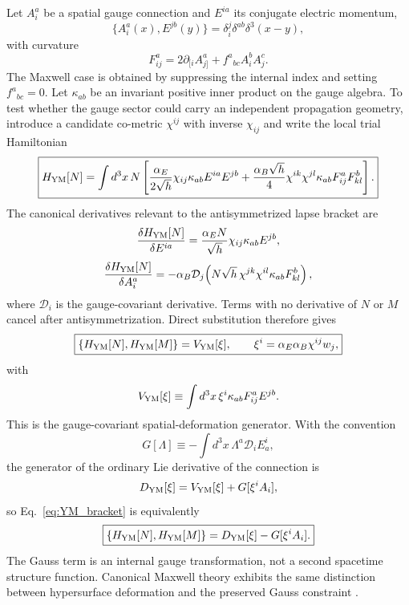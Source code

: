 \documentclass[11pt]{article}
\begin{document}
Let $A_i^a$ be a spatial gauge connection and $E^{ia}$ its conjugate electric momentum,
\begin{equation}
    \{A_i^a(x),E^{jb}(y)\}
    =\delta_i^j\delta^{ab}\delta^3(x-y),
\end{equation}
with curvature
\begin{equation}
    F_{ij}^a=2\partial_{[i}A_{j]}^a+f^a{}_{bc}A_i^bA_j^c.
\end{equation}
The Maxwell case is obtained by suppressing the internal index and setting $f^a{}_{bc}=0$. Let $\kappa_{ab}$ be an invariant positive inner product on the gauge algebra. To test whether the gauge sector could carry an independent propagation geometry, introduce a candidate co-metric $\chi^{ij}$ with inverse $\chi_{ij}$ and write the local trial Hamiltonian
\begin{equation}
\boxed{
H_{\rm YM}[N]
=\int d^3x\,N\left[
\frac{\alpha_E}{2\sqrt h}\chi_{ij}\kappa_{ab}E^{ia}E^{jb}
+\frac{\alpha_B\sqrt h}{4}\chi^{ik}\chi^{jl}
\kappa_{ab}F^a_{ij}F^b_{kl}
\right].}
\label{eq:YM_trial_H}
\end{equation}
The canonical derivatives relevant to the antisymmetrized lapse bracket are
\begin{equation}
    \frac{\delta H_{\rm YM}[N]}{\delta E^{ia}}
    =\frac{\alpha_E N}{\sqrt h}\chi_{ij}\kappa_{ab}E^{jb},
\end{equation}
\begin{equation}
    \frac{\delta H_{\rm YM}[N]}{\delta A_i^a}
    =-\alpha_B\mathcal D_j\!\left(
    N\sqrt h\,\chi^{jk}\chi^{il}\kappa_{ab}F^b_{kl}
    \right),
\end{equation}
where $\mathcal D_i$ is the gauge-covariant derivative. Terms with no derivative of $N$ or $M$ cancel after antisymmetrization. Direct substitution therefore gives
\begin{equation}
\boxed{
\{H_{\rm YM}[N],H_{\rm YM}[M]\}
=V_{\rm YM}[\xi],
\qquad
\xi^i=\alpha_E\alpha_B\chi^{ij}w_j,}
\label{eq:YM_bracket}
\end{equation}
with
\begin{equation}
    V_{\rm YM}[\xi]
    \equiv\int d^3x\,\xi^i\kappa_{ab}F^a_{ij}E^{jb}.
\end{equation}
This is the gauge-covariant spatial-deformation generator. With the convention
\begin{equation}
    G[\Lambda]
    \equiv-\int d^3x\,\Lambda^a\mathcal D_iE_a^i,
\end{equation}
the generator of the ordinary Lie derivative of the connection is
\begin{equation}
    D_{\rm YM}[\xi]
    =V_{\rm YM}[\xi]+G[\xi^iA_i],
\end{equation}
so Eq.~\eqref{eq:YM_bracket} is equivalently
\begin{equation}
\boxed{
\{H_{\rm YM}[N],H_{\rm YM}[M]\}
=D_{\rm YM}[\xi]-G[\xi^iA_i].}
\label{eq:YM_diff_plus_Gauss}
\end{equation}
The Gauss term is an internal gauge transformation, not a second spacetime structure function. Canonical Maxwell theory exhibits the same distinction between hypersurface deformation and the preserved Gauss constraint \cite{KucharStone1987}.
\end{document}
